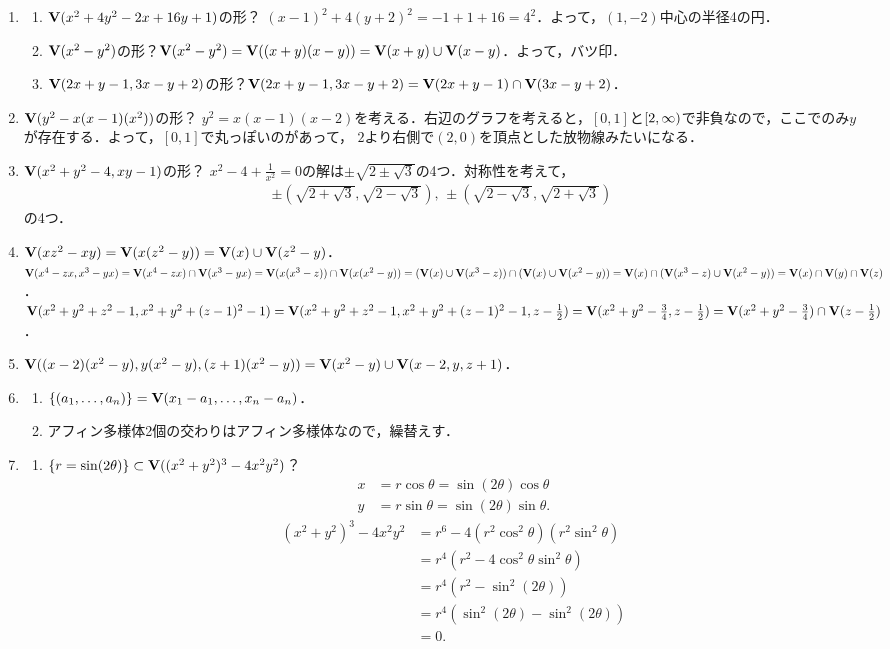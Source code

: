 \documentclass[9pt]{ltjsarticle}
\theoremstyle{break}
\theoremstyle{break}
\theoremstyle{break}
\theoremstyle{break}
\theoremstyle{break}
\theoremstyle{break}
\theoremstyle{break}
\theoremstyle{break}
\theoremstyle{break}
\theoremstyle{break}
\theoremstyle{break}
\theoremstyle{break}
\theoremstyle{break}
\theoremstyle{break}
\theoremstyle{break}
\theoremstyle{nonumberbreak}
\theoremstyle{nonumberbreak}
\begin{document}
\begin{enumerate}[label=(問題\arabic*)]
 \item
\begin{enumerate}[label=(\alph*)]
 \item $\textbf V(x^2+4y^2-2x+16y+1)$の形？
$(x-1)^2 + 4(y+2)^2 = -1 + 1 + 16 = 4^2$．よって，$(1,-2)$中心の半径4の円．
 \item $\textbf V(x^2-y^2)$の形？$\textbf V(x^2-y^2)=\textbf V((x+y)(x-y))=\textbf V(x+y)\cup \textbf V(x-y)$．よって，バツ印．
 \item $\textbf V(2x+y-1,3x-y+2)$の形？$\textbf V(2x+y-1,3x-y+2)=\textbf V(2x+y-1)\cap \textbf V(3x-y+2)$．
\end{enumerate}
 \item $\textbf V(y^2-x(x-1)(x^2))$の形？
$y^2 = x(x-1)(x-2)$を考える．右辺のグラフを考えると，$[0,1]$と$\left[2,\infty\right)$で非負なので，ここでのみ$y$が存在する．よって，$[0,1]$で丸っぽいのがあって，
$2$より右側で$(2,0)$を頂点とした放物線みたいになる．
 \item $\textbf V(x^2+y^2-4,xy-1)$の形？
$x^2-4+\frac{1}{x^2}=0$の解は$\pm\sqrt{2\pm\sqrt{3}}$の4つ．対称性を考えて，
\begin{align}
 \pm(\sqrt{2+\sqrt{3}},\sqrt{2-\sqrt{3}}),\,
\pm(\sqrt{2-\sqrt{3}},\sqrt{2+\sqrt{3}})
\end{align}
の4つ．
 \item
$\textbf V(xz^2-xy)=\textbf V(x(z^2-y))=\textbf V(x)\cup \textbf V(z^2-y)$．
$\textbf V(x^4-zx,x^3-yx)=\textbf V(x^4-zx)\cap \textbf V(x^3-yx)=\textbf V(x(x^3-z))\cap \textbf V(x(x^2-y))=(\textbf V(x)\cup \textbf V(x^3-z))\cap (\textbf V(x)\cup \textbf V(x^2-y)) = \textbf V(x)\cap (\textbf V(x^3-z)\cup \textbf V(x^2-y))=\textbf V(x)\cap \textbf V(y)\cap \textbf V(z)$．
$\textbf V(x^2+y^2+z^2-1,x^2+y^2+(z-1)^2-1)=\textbf V(x^2+y^2+z^2-1,x^2+y^2+(z-1)^2-1,z-\frac{1}{2})=\textbf V(x^2+y^2-\frac{3}{4},z-\frac{1}{2})=\textbf V(x^2+y^2-\frac{3}{4})\cap \textbf V(z-\frac{1}{2})$．
 \item $\textbf V((x-2)(x^2-y),y(x^2-y),(z+1)(x^2-y))=\textbf V(x^2-y)\cup \textbf V(x-2,y,z+1)$．
 \item
\begin{enumerate}[label=(\alph*)]
 \item $\left\{(a_1,\dots,a_n)\right\}=\textbf V(x_1-a_1,\dots,x_n-a_n)$．
 \item アフィン多様体2個の交わりはアフィン多様体なので，繰替えす．
\end{enumerate}
 \item
\begin{enumerate}[label=(\alph*)]
 \item
 $\left\{r=\sin(2\theta)\right\}\subset \textbf V((x^2+y^2)^3-4x^2y^2)$？
\begin{align}
 x&=r\cos\theta = \sin(2\theta)\cos\theta\\
 y& =r\sin\theta = \sin(2\theta)\sin\theta.
\end{align}
\begin{align}
 (x^2+y^2)^3-4x^2y^2
&=
r^6 - 4(r^2\cos^2\theta)(r^2\sin^2\theta)\\
 & =
r^4(r^2-4\cos^2\theta \sin^2\theta)\\
 & =
r^4(r^2-\sin^2(2\theta))\\
 & =
r^4(\sin^2(2\theta)-\sin^2(2\theta))\\
 & =0.
\end{align}


\end{enumerate}
\end{enumerate}
\end{document}
